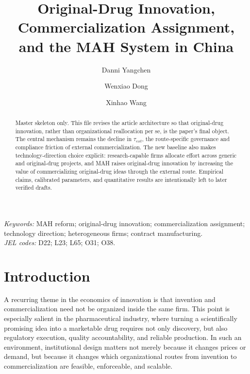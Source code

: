 \documentclass[12pt]{article}
\title{Original-Drug Innovation, Commercialization Assignment,\\and the MAH System in China}
\author{Danni Yangchen \and Wenxiao Dong \and Xinhao Wang}
\date{}
\begin{document}
\maketitle
\thispagestyle{plain}

\begin{abstract}\noindent
Master skeleton only. This file revises the article architecture so that original-drug innovation, rather than organizational reallocation per se, is the paper's final object. The central mechanism remains the decline in $\tau_{\mathit{ext}}$, the route-specific governance and compliance friction of external commercialization. The new baseline also makes technology-direction choice explicit: research-capable firms allocate effort across generic and original-drug projects, and MAH raises original-drug innovation by increasing the value of commercializing original-drug ideas through the external route. Empirical claims, calibrated parameters, and quantitative results are intentionally left to later verified drafts.
\end{abstract}

\noindent\textit{Keywords:} MAH reform; original-drug innovation; commercialization assignment; technology direction; heterogeneous firms; contract manufacturing.\\
\noindent\textit{JEL codes:} D22; L23; L65; O31; O38.


\section{Introduction}

A recurring theme in the economics of innovation is that invention and commercialization need not be organized inside the same firm. This point is especially salient in the pharmaceutical industry, where turning a scientifically promising idea into a marketable drug requires not only discovery, but also regulatory execution, quality accountability, and reliable production. In such an environment, institutional design matters not merely because it changes prices or demand, but because it changes which organizational routes from invention to commercialization are feasible, enforceable, and scalable.
\end{document}
